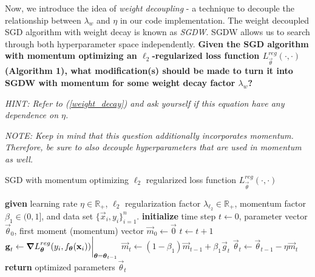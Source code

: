 \begin{enumerate}[(a)]
{\begin{enumerate}[(i)]
{        Now, we introduce the idea of \textit{weight decoupling} - a technique to decouple the relationship between $\lambda_w$ and $\eta$ in our code implementation. The weight decoupled SGD algorithm with weight decay is known as \textit{SGDW}. SGDW allows us to search through both hyperparameter space independently. \textbf{Given the SGD algorithm with momentum optimizing an $\ell_2$-regularized loss function $L_{\vec{\theta}}^{reg}(\cdot, \cdot)$ (Algorithm 1), what modification(s) should be made to turn it into SGDW with momentum for some weight decay factor $\lambda_w$?} 
        
        \textit{HINT: Refer to (\ref{weight_decay}) and ask yourself if this equation have any dependence on $\eta$.}
        
        \textit{NOTE: Keep in mind that this question additionally incorporates momentum. Therefore, be sure to also decouple hyperparameters that are used in momentum as well.}
        \begin{algorithm}\label{SGD}
            \caption{SGD with momentum optimizing $\ell_2$ regularized loss function $L_{\vec{\theta}}^{reg}(\cdot, \cdot)$}
            \begin{algorithmic}[1]
                \State \textbf{given} learning rate $\eta \in \mathbb{R}_{+}$, $\ell_2$ regularization factor $\lambda_{\ell_2} \in \mathbb{R}_{+}$, momentum factor $\beta_1 \in (0, 1]$, and data set $\{\vec{x}_i, y_i\}_{i = 1}^n$.
                \State \textbf{initialize} time step $t \leftarrow  0$, parameter vector $\vec{\theta}_0$, first moment (momentum) vector $\vec{m}_0 \leftarrow \vec{0}$
                    \State $t \leftarrow t+1$
                    \State $ \boldsymbol{\mathbf{g}}_t \leftarrow \grad L^{reg}_{\boldsymbol{\mathbf{\theta}}}(y_i, f_{\boldsymbol{\mathbf{\theta}}}(\boldsymbol{\mathbf{x}}_i))\bigg|_{\boldsymbol{\mathbf{\theta}} = \boldsymbol{\mathbf{\theta}}_{t-1}}$
                    \State $\vec{m}_t \leftarrow (1-\beta_1) \vec{m}_{t-1} + \beta_1 \vec{g}_t$
                    \State $\vec{\theta}_t \leftarrow \vec{\theta}_{t-1} - \eta \vec{m}_t$
                \EndWhile
                \State \textbf{return} optimized parameters $\vec{\theta}_t$
            \end{algorithmic} 
        \end{algorithm}
        }
        \\
        

\end{enumerate}}
\end{enumerate}
